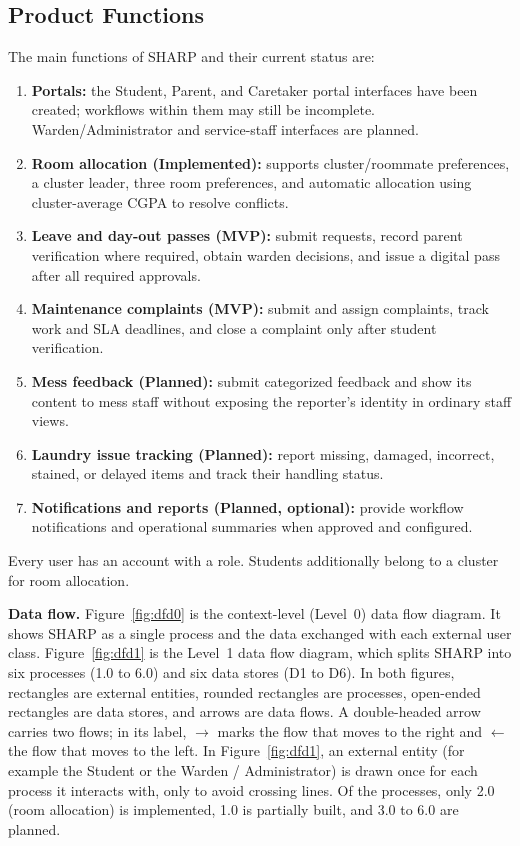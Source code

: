 \documentclass[11pt,a4paper]{article}
\numberwithin{figure}{section}   %
\begin{document}
\subsection{Product Functions}
The main functions of SHARP and their current status are:
\begin{enumerate}
\item \textbf{Portals:} the Student, Parent, and Caretaker portal interfaces have been created; workflows within them may still be incomplete. Warden/Administrator and service-staff interfaces are planned.
\item \textbf{Room allocation (Implemented):} supports cluster/roommate preferences, a cluster leader, three room preferences, and automatic allocation using cluster-average CGPA to resolve conflicts.
\item \textbf{Leave and day-out passes (MVP):} submit requests, record parent verification where required, obtain warden decisions, and issue a digital pass after all required approvals.
\item \textbf{Maintenance complaints (MVP):} submit and assign complaints, track work and SLA deadlines, and close a complaint only after student verification.
\item \textbf{Mess feedback (Planned):} submit categorized feedback and show its content to mess staff without exposing the reporter's identity in ordinary staff views.
\item \textbf{Laundry issue tracking (Planned):} report missing, damaged, incorrect, stained, or delayed items and track their handling status.
\item \textbf{Notifications and reports (Planned, optional):} provide workflow notifications and operational summaries when approved and configured.
\end{enumerate}

Every user has an account with a role. Students additionally belong to a cluster for room allocation.

\textbf{Data flow.} Figure~\ref{fig:dfd0} is the context-level (Level~0) data flow diagram. It shows SHARP as a single process and the data exchanged with each external user class. Figure~\ref{fig:dfd1} is the Level~1 data flow diagram, which splits SHARP into six processes (1.0 to 6.0) and six data stores (D1 to D6). In both figures, rectangles are external entities, rounded rectangles are processes, open-ended rectangles are data stores, and arrows are data flows. A double-headed arrow carries two flows; in its label, $\rightarrow$ marks the flow that moves to the right and $\leftarrow$ the flow that moves to the left. In Figure~\ref{fig:dfd1}, an external entity (for example the Student or the Warden / Administrator) is drawn once for each process it interacts with, only to avoid crossing lines. Of the processes, only 2.0 (room allocation) is implemented, 1.0 is partially built, and 3.0 to 6.0 are planned.
\end{document}
